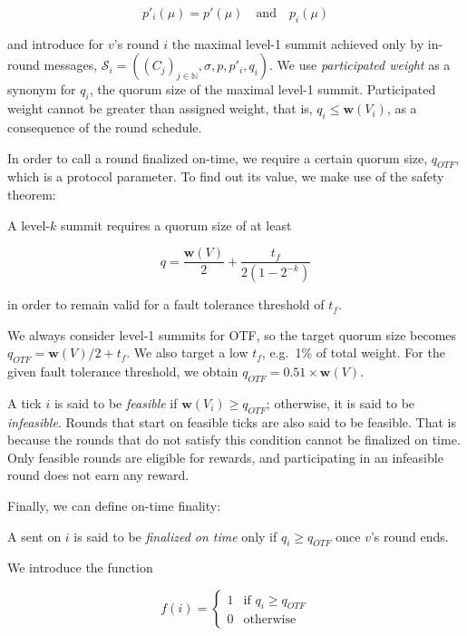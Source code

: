 \begin{equation}
  p'_{i}(\mu) = p'(\mu)\quad\text{and}\quad p_{i}(\mu)
\end{equation}

and introduce for $v$'s round $i$ the maximal level-1 summit achieved only by in-round messages, $\mathcal{S}_{i}=((C_j)_{j\in\mathbb{N}}, \sigma,p,p'_{i},q_{i})$. We use \emph{participated weight} as a synonym for $q_{i}$, the quorum size of the maximal level-1 summit. Participated weight cannot be greater than assigned weight, that is, $q_{i} \leq \boldsymbol{w}(V_i)$, as a consequence of the round schedule.

In order to call a round finalized on-time, we require a certain quorum size, $q_{OTF}$, which is a protocol parameter. To find out its value, we make use of the safety theorem:

\begin{theorem}
  A level-$k$ summit requires a quorum size of at least

  \begin{equation}
    q = \frac{\boldsymbol{w}(V)}{2} + \frac{t_f}{2(1-2^{-k})}
  \end{equation}

  in order to remain valid for a fault tolerance threshold of $t_f$.
\end{theorem}

We always consider level-1 summits for OTF, so the target quorum size becomes $q_{OTF}=\boldsymbol{w}(V)/2+t_f$. We also target a low $t_f$, e.g.~1\% of total weight. For the given fault tolerance threshold, we obtain $q_{OTF} = 0.51 \times \boldsymbol{w}(V)$.

A tick $i$ is said to be \emph{feasible} if $\boldsymbol{w}(V_i)\geq q_{OTF}$; otherwise, it is said to be \emph{infeasible}. Rounds that start on feasible ticks are also said to be feasible. That is because the rounds that do not satisfy this condition cannot be finalized on time. Only feasible rounds are eligible for rewards, and participating in an infeasible round does not earn any reward.

Finally, we can define on-time finality:

\begin{definition}
  A \PROP sent on $i$ is said to be \emph{finalized on time} only if $q_{i} \geq q_{OTF}$ once $v$'s round ends.
\end{definition}

We introduce the function

\begin{equation}
  f(i) =
  \begin{cases}
    1 & \text{if } q_{i} \geq q_{OTF} \\
    0 & \text{otherwise}
  \end{cases}
\end{equation}

